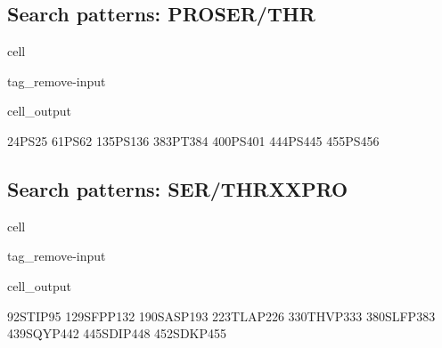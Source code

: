 \documentclass[letterpaper,10pt,english]{jupyterBook}
\begin{document}
\subsection{Search patterns: PRO\sphinxhyphen{}SER/THR}
\label{\detokenize{ipynb/chapter2:search-patterns-pro-ser-thr}}
\begin{sphinxuseclass}{cell}
\begin{sphinxuseclass}{tag_remove-input}\begin{sphinxVerbatimOutput}

\begin{sphinxuseclass}{cell_output}
\begin{sphinxVerbatim}[commandchars=\\\{\}]
24\PYGZhy{}PS\PYGZhy{}25
61\PYGZhy{}PS\PYGZhy{}62
135\PYGZhy{}PS\PYGZhy{}136
383\PYGZhy{}PT\PYGZhy{}384
400\PYGZhy{}PS\PYGZhy{}401
444\PYGZhy{}PS\PYGZhy{}445
455\PYGZhy{}PS\PYGZhy{}456
\end{sphinxVerbatim}

\end{sphinxuseclass}\end{sphinxVerbatimOutput}

\end{sphinxuseclass}
\end{sphinxuseclass}

\subsection{Search patterns: SER/THR\sphinxhyphen{}X\sphinxhyphen{}X\sphinxhyphen{}PRO}
\label{\detokenize{ipynb/chapter2:search-patterns-ser-thr-x-x-pro}}
\begin{sphinxuseclass}{cell}
\begin{sphinxuseclass}{tag_remove-input}\begin{sphinxVerbatimOutput}

\begin{sphinxuseclass}{cell_output}
\begin{sphinxVerbatim}[commandchars=\\\{\}]
92\PYGZhy{}STIP\PYGZhy{}95
129\PYGZhy{}SFPP\PYGZhy{}132
190\PYGZhy{}SASP\PYGZhy{}193
223\PYGZhy{}TLAP\PYGZhy{}226
330\PYGZhy{}THVP\PYGZhy{}333
380\PYGZhy{}SLFP\PYGZhy{}383
439\PYGZhy{}SQYP\PYGZhy{}442
445\PYGZhy{}SDIP\PYGZhy{}448
452\PYGZhy{}SDKP\PYGZhy{}455
\end{sphinxVerbatim}

\end{sphinxuseclass}\end{sphinxVerbatimOutput}

\end{sphinxuseclass}
\end{sphinxuseclass}
\end{document}
